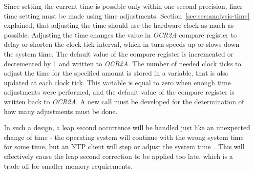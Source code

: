 Since setting the current time is possible only within one second precision,
finer time setting must be made using time adjustments.
Section~\ref{sec:sec:analysis-time} explained, that adjusting the time
should use the hardware clock as much as possible.
Adjusting the time changes the value in {\it{OCR2A}} compare register
to delay or shorten the clock tick interval,
which in turn speeds up or slows down the system time.
The default value of the compare register is incremented or decremented by 1
and written to {\it{OCR2A}}.
The number of needed clock ticks to adjust the time for the specified amount
is stored in a variable, that is also updated at each clock tick.
This variable is equal to zero when enough time adjustments were performed,
and the default value of the compare register is written back to {\it{OCR2A}}.
A new call must be developed for the determination of how many adjustments must be done.

In such a design, a leap second occurrence will be handled just like an unexpected change of time -
the operating system will continue with the wrong system time for some time,
but an NTP client will step or adjust the system time~\cite{ntp-faq}.
This will effectively cause the leap second correction to be applied too late,
which is a trade-off for smaller memory requirements.


